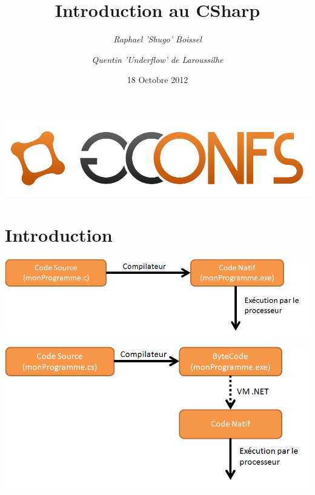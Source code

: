 \documentclass{beamer}
\begin{document}
\title{Introduction au CSharp}
\author{\textit{Raphael 'Shugo' Boissel} \and \textit{Quentin 'Underflow' de
Laroussilhe}}
\date{18 Octobre 2012}

\begin{frame}
  \begin{center}
    \includegraphics[scale=0.35]{images/gconfs.png}
  \end{center}

  \maketitle
\end{frame}

\begin{frame}
  \tableofcontents
\end{frame}

\section{Introduction}
\begin{frame}
  \begin{center}
    \includegraphics[scale=0.50]{images/comp_nat.png}
  \end{center}
\end{frame}

\begin{frame}
  \begin{center}
    \includegraphics[scale=0.40]{images/comp_bc.png}
  \end{center}
\end{frame}
\end{document}
